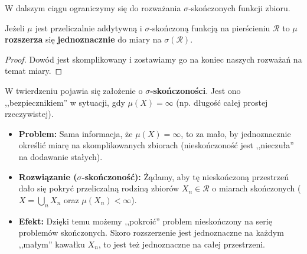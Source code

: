 W dalszym ciągu ograniczymy się do rozważania $\sigma$-skończonych funkcji zbioru.
\begin{theorem}
	Jeżeli $\mu$ jest przeliczalnie addytywną i $\sigma$-skończoną funkcją na pierścieniu $\mathcal{R}$ to $\mu$ \textbf{rozszerza } się \textbf{jednoznacznie } do miary na $\sigma\left( \mathcal{R} \right) $.
\end{theorem} 
\begin{proof}
	Dowód jest skomplikowany i zostawiamy go na koniec naszych rozważań na temat miary.
\end{proof} 
\begin{remark}

W twierdzeniu pojawia się założenie o \textbf{$\sigma$-skończoności}. Jest ono ,,bezpiecznikiem'' w sytuacji, gdy $\mu(X) = \infty$ (np. długość całej prostej rzeczywistej).
\begin{itemize}
    \item \textbf{Problem:} Sama informacja, że $\mu(X) = \infty$, to za mało, by jednoznacznie określić miarę na skomplikowanych zbiorach (nieskończoność jest ,,nieczuła'' na dodawanie stałych).
    \item \textbf{Rozwiązanie ($\sigma$-skończoność):} Żądamy, aby tę nieskończoną przestrzeń dało się pokryć przeliczalną rodziną zbiorów $X_n \in \mathcal{R}$ o miarach skończonych ($X = \bigcup_{n} X_n$ oraz $\mu(X_n) < \infty$).
    \item \textbf{Efekt:} Dzięki temu możemy ,,pokroić'' problem nieskończony na serię problemów skończonych. Skoro rozszerzenie jest jednoznaczne na każdym ,,małym'' kawałku $X_n$, to jest też jednoznaczne na całej przestrzeni.
\end{itemize}

\end{remark} 
